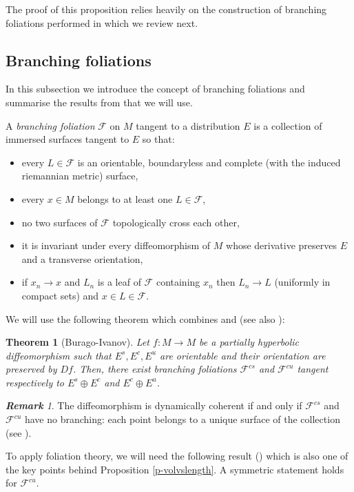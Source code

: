 \documentclass[11pt]{amsart} %
\newcommand{\Es}{E^s}
\newcommand{\Ec}{E^c}
\newcommand{\Eu}{E^u}
\newcommand{\cF}{\mathcal{F}}
\newcommand{\Fcu}{\mathcal{F}^{cu}}
\newcommand{\Fcs}{\mathcal{F}^{cs}}
\numberwithin{equation}{section}
\newtheorem{teo}[equation]{Theorem}
\theoremstyle{remark}
\newtheorem*{remark} {\textbf{Remark}}
\begin{document}
The proof of this proposition relies heavily on the construction of branching foliations performed in \cite{BI} which we review next. 


\subsection{Branching foliations}
In this subsection we introduce the concept of branching foliations and summarise the results from \cite{BI} that we will use. 

A \emph{branching foliation} $\cF$ on $M$ tangent to a distribution $E$ is a collection of immersed surfaces tangent to $E$ so that:

\begin{itemize}
\item every $L \in \cF$ is an orientable, boundaryless and complete (with the induced riemannian metric) surface, 
\item every $x\in M$ belongs to at least one $L \in \cF$,
%
\item no two surfaces of $\cF$ topologically cross each other, 
\item it is invariant under every diffeomorphism of $M$ whose derivative preserves $E$ and a transverse orientation,
\item if $x_n \to x$ and $L_n$ is a leaf of $\cF$ containing $x_n$ then $L_n \to L$ (uniformly in compact sets) and $x\in L \in \cF$. 
\end{itemize}

We will use the following theorem which combines \cite[Theorem 4.1]{BI} and \cite[Lemma 7.1]{BI} (see also \cite[Section 4]{HP-Survey}): 

\begin{teo}[Burago-Ivanov]\label{teoBI1} Let $f: M \to M$ be a partially hyperbolic diffeomorphism such that $\Es,\Ec,\Eu$ are orientable and their orientation are preserved by $Df$. Then, there exist branching foliations $\Fcs$ and $\Fcu$ tangent respectively to $\Es \oplus \Ec$ and $\Ec \oplus \Eu$. 
\end{teo}

\begin{remark}
The diffeomorphism is dynamically coherent if and only if $\Fcs$ and $\Fcu$ have no branching: each point belongs to a unique surface of the collection (see \cite{HP-Survey}).
\end{remark}

To apply foliation theory, we will need the following result (\cite[Theorem 7.2]{BI}) which is also one of the key points behind Proposition \ref{p-volvslength}. A symmetric statement holds for $\Fcu$. 
\end{document}
